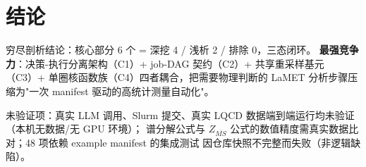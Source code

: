 \documentclass[UTF8]{ctexart}
\begin{document}
\section{结论}

\begin{conclbox}
穷尽剖析结论：核心部分 6 个 = 深挖 4 / 浅析 2 / 排除 0，三态闭环。
\textbf{最强竞争力}：决策-执行分离架构（C1）+ job-DAG 契约（C2）+ 共享重采样基元（C3）+
单圈核函数族（C4）四者耦合，把需要物理判断的 LaMET 分析步骤压缩为"一次 manifest 驱动的高统计测量自动化"。
\end{conclbox}

\begin{warnbox}
未验证项：真实 LLM 调用、Slurm 提交、真实 LQCD 数据端到端运行均未验证（本机无数据/无 GPU 环境）；
谱分解公式与 $Z_{\overline{MS}}$ 公式的数值精度需真实数据比对；48 项依赖 example manifest 的集成测试
因仓库快照不完整而失败（非逻辑缺陷）。
\end{warnbox}
\end{document}
